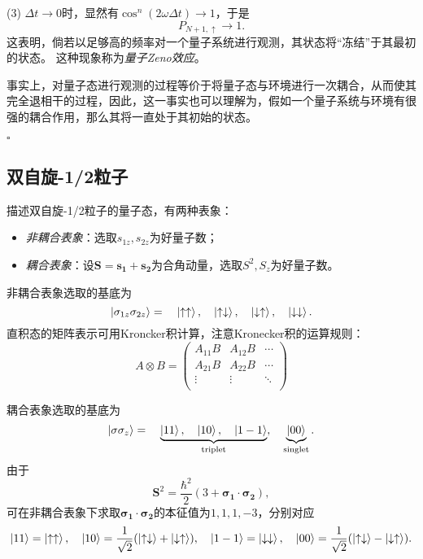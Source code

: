 \begin{tcolorbox}[breakable, title={\textbf{趣题：量子Zeno效应}}]
    (3)
    $Δt→0$时，显然有$\cos^n(2ωΔt)→1$，于是
    \begin{equation}
        P_{N+1,↑} → 1.
    \end{equation}
    这表明，倘若以足够高的频率对一个量子系统进行观测，其状态将``冻结''于其最初的状态。
    这种现象称为\emph{量子Zeno效应}。

    事实上，对量子态进行观测的过程等价于将量子态与环境进行一次耦合，从而使其完全退相干的过程，因此，这一事实也可以理解为，假如一个量子系统与环境有很强的耦合作用，那么其将一直处于其初始的状态。

    \hfill $\square$
\end{tcolorbox}


\subsection{双自旋-1/2粒子}
\label{subsec:spin_double_particle}

描述双自旋-1/2粒子的量子态，有两种表象：
\begin{itemize}
    \item \emph{非耦合表象}：选取$s_{1z}, s_{2z}$为好量子数；
    \item \emph{耦合表象}：设$\bm{S}=\bm{s_1}+\bm{s_2}$为合角动量，选取$S^2, S_z$为好量子数。
\end{itemize}

非耦合表象选取的基底为
\begin{equation}
    \ket{\sigma_{1z}\sigma_{2z}} =\quad \ket{\uparrow\uparrow}, \quad \ket{\uparrow\downarrow}, \quad \ket{\downarrow\uparrow}, \quad \ket{\downarrow\downarrow}.
\end{equation}
直积态的矩阵表示可用Kroncker积计算，注意Kronecker积的运算规则：
\begin{equation}
    A \otimes B =
    \begin{pmatrix}
        A_{11}B & A_{12}B & \cdots \\
        A_{21}B & A_{22}B & \cdots \\
        \vdots  & \vdots  & \ddots \\
    \end{pmatrix}
\end{equation}

耦合表象选取的基底为
\begin{equation}
    \ket{\sigma \sigma_z} = \quad \underbrace{\ket{11}, \quad \ket{10}, \quad \ket{1-1}}_{\text{triplet}}, \quad \underbrace{\ket{00}}_{\text{singlet}}.
\end{equation}
由于
\begin{equation}
    \bm{S}^2 = \frac{\hbar^2}{2}(3+\bm{\sigma_1}\cdot\bm{\sigma_2}),
\end{equation}
可在非耦合表象下求取$\bm{\sigma_1}\cdot\bm{\sigma_2}$的本征值为$1,1,1,-3$，分别对应
\begin{equation}
    \ket{11}=\ket{\uparrow\uparrow},\quad \ket{10}=\frac{1}{\sqrt{2}}(\ket{\uparrow\downarrow}+\ket{\downarrow\uparrow}),\quad \ket{1-1}=\ket{\downarrow\downarrow}, \quad \ket{00}=\frac{1}{\sqrt{2}}(\ket{\uparrow\downarrow}-\ket{\downarrow\uparrow}).
\end{equation}

